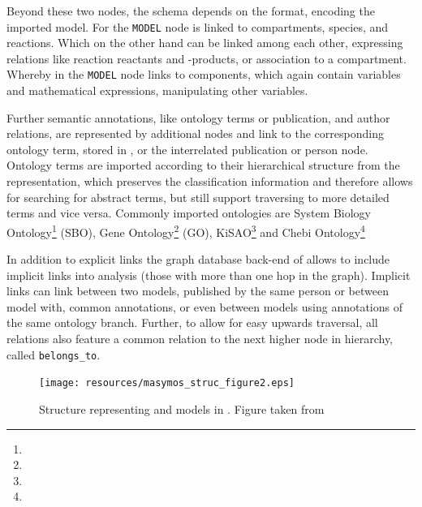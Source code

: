 Beyond these two nodes, the schema depends on the format, encoding the imported model. For \sbml the \texttt{MODEL} node is linked to compartments, species, and reactions. Which on the other hand can be linked among each other, expressing relations like reaction reactants and -products, or association to a compartment.
Whereby in \cellml the \texttt{MODEL} node links to components, which again contain variables and mathematical expressions, manipulating other variables.

Further semantic annotations, like ontology terms or publication, and author relations, are represented by additional nodes and link to the corresponding ontology term, stored in \neoj, or the interrelated publication or person node. 
Ontology terms are imported according to their hierarchical structure from the \owl representation, which preserves the classification information and therefore allows for searching for abstract terms, but still support traversing to more detailed terms and vice versa.
Commonly imported ontologies are System Biology Ontology\footnote{} (SBO), Gene Ontology\footnote{} (GO), KiSAO\footnote{} and Chebi Ontology\footnote{}

In addition to explicit links the graph database back-end of \masymos allows to include implicit links into analysis (those with more than one hop in the graph). Implicit links can link between two models, published by the same person or between model with, common annotations, or even between models using annotations of the same ontology branch.
Further, to allow for easy upwards traversal, all relations also feature a common relation to the next higher node in hierarchy, called \texttt{belongs\_to}.

\begin{figure}
	\centering
	\texttt{[image: resources/masymos\_struc\_figure2.eps]}
	\caption{Structure representing \sbml and \cellml models in \masymos. Figure taken from \citealt{Henkel2015}}
	\label{fig:background:graph-db:masymos}
\end{figure}


